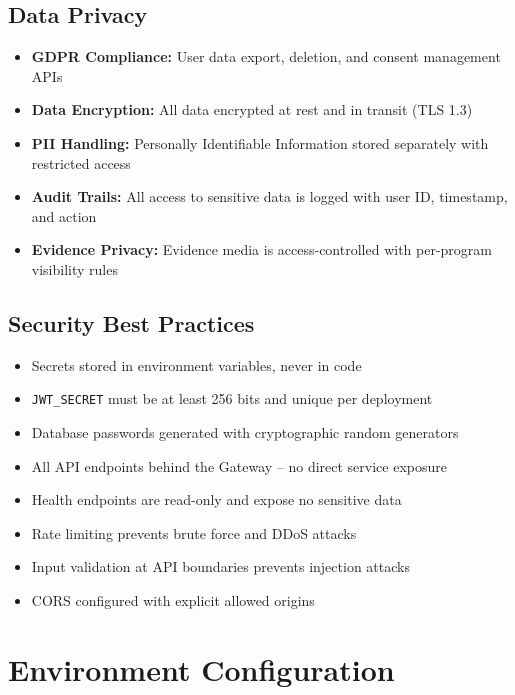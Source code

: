 \documentclass[11pt,a4paper]{article}
\begin{document}
\subsection{Data Privacy}

\begin{itemize}
  \item \textbf{GDPR Compliance:} User data export, deletion, and consent management APIs
  \item \textbf{Data Encryption:} All data encrypted at rest and in transit (TLS 1.3)
  \item \textbf{PII Handling:} Personally Identifiable Information stored separately with restricted access
  \item \textbf{Audit Trails:} All access to sensitive data is logged with user ID, timestamp, and action
  \item \textbf{Evidence Privacy:} Evidence media is access-controlled with per-program visibility rules
\end{itemize}

\subsection{Security Best Practices}

\begin{itemize}
  \item Secrets stored in environment variables, never in code
  \item \texttt{JWT\_SECRET} must be at least 256 bits and unique per deployment
  \item Database passwords generated with cryptographic random generators
  \item All API endpoints behind the Gateway -- no direct service exposure
  \item Health endpoints are read-only and expose no sensitive data
  \item Rate limiting prevents brute force and DDoS attacks
  \item Input validation at API boundaries prevents injection attacks
  \item CORS configured with explicit allowed origins
\end{itemize}

\clearpage

\section{Environment Configuration}
\end{document}
